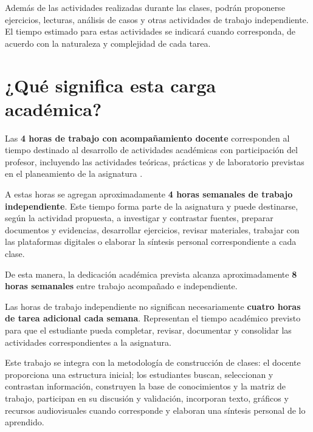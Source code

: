\documentclass[12pt,a4paper]{article}
\begin{document}
Además de las actividades realizadas durante las clases, podrán proponerse
ejercicios, lecturas, análisis de casos y otras actividades de trabajo
independiente. El tiempo estimado para estas actividades se indicará cuando
corresponda, de acuerdo con la naturaleza y complejidad de cada tarea.

\section{¿Qué significa esta carga académica?}

Las \textbf{4 horas de trabajo con acompañamiento docente} corresponden al
 tiempo destinado al desarrollo de actividades académicas con participación
 del profesor, incluyendo las actividades teóricas, prácticas y de laboratorio
 previstas en el planeamiento de la asignatura \parencite{armoa2026planeamiento}.

A estas horas se agregan aproximadamente \textbf{4 horas semanales de trabajo
independiente}. Este tiempo forma parte de la asignatura y puede destinarse,
según la actividad propuesta, a investigar y contrastar fuentes, preparar
documentos y evidencias, desarrollar ejercicios, revisar materiales, trabajar
con las plataformas digitales o elaborar la síntesis personal correspondiente
a cada clase.

De esta manera, la dedicación académica prevista alcanza aproximadamente
\textbf{8 horas semanales} entre trabajo acompañado e independiente.

\begin{tcolorbox}[
colback=gray!5,
colframe=black,
title=\textbf{Una idea importante},
sharp corners,
boxrule=0.8pt,
width=\textwidth
]

Las horas de trabajo independiente no significan necesariamente
\textbf{cuatro horas de tarea adicional cada semana}. Representan el tiempo
académico previsto para que el estudiante pueda completar, revisar, documentar
y consolidar las actividades correspondientes a la asignatura.

Este trabajo se integra con la metodología de construcción de clases: el
docente proporciona una estructura inicial; los estudiantes buscan,
seleccionan y contrastan información, construyen la base de conocimientos y
la matriz de trabajo, participan en su discusión y validación, incorporan
texto, gráficos y recursos audiovisuales cuando corresponde y elaboran una
síntesis personal de lo aprendido.

\end{tcolorbox}
\end{document}
